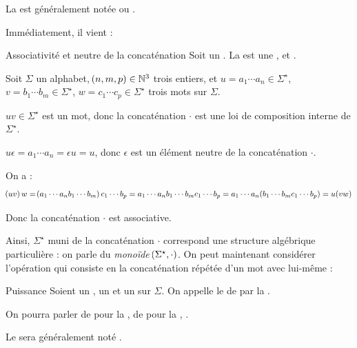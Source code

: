 \documentclass[a4paper,french,bookmarks]{book}
\begin{document}
    \begin{notation}
        La  est généralement notée  ou .
    \end{notation}
    
    Immédiatement, il vient :
    \begin{property}{Associativité et neutre de la concaténation}{}
        Soit \hg{$\Sigma$} un . La  est une ,  et .
    \end{property}
    \begin{nproof}
        Soit $\Sigma$ un alphabet, $\!\left(n, m, p\right) \in \mathbb{N}^3$ trois entiers, et $u = a_1\cdots a_n \in \Sigma^\star$, $v = b_1\cdots b_m \in \Sigma^\star$, $w = c_1\cdots c_p \in \Sigma^\star$ trois mots sur $\Sigma$.
        \begin{enumerate}
            \itt $uv \in \Sigma^\star$ est un mot, donc la concaténation $\cdot$ est une loi de composition interne de $\Sigma^\star$.
            
            \itt $u\epsilon = a_1\cdots a_n = \epsilon u = u$, donc $\epsilon$ est un élément neutre de la concaténation $\cdot$.
            
            \itt On a :
            \[ \!\left(uv\right)w = \!\left(a_1\cdots a_nb_1\cdots b_m\right)c_1 \cdots b_p = a_1\cdots a_nb_1\cdots b_mc_1\cdots b_p = a_1 \cdots a_n\!\left(b_1 \cdots b_mc_1 \cdots b_p\right) = u\!\left(vw\right)\]
        \end{enumerate}
        \qquad\quad Donc la concaténation $\cdot$ est associative.
    \end{nproof}
    
    Ainsi, $\Sigma^\star$ muni de la concaténation $\cdot$ correspond une structure algébrique particulière : on parle du \textit{monoïde} $\!\left(\Sigma^\star, \cdot\right)$.
    On peut maintenant considérer l'opération qui consiste en la concaténation répétée d'un mot avec lui-même :
    
    \begin{definition}{Puissance}{}
        Soient \hg{$\Sigma$} un ,  un  et  un  sur $\Sigma$. On appelle  le  de  par la .\medskip
        
        On pourra parler de  pour la , de  pour la , \etc.
    \end{definition}
    \begin{notation}
        Le  sera généralement noté .
    \end{notation}
    
\end{document}
